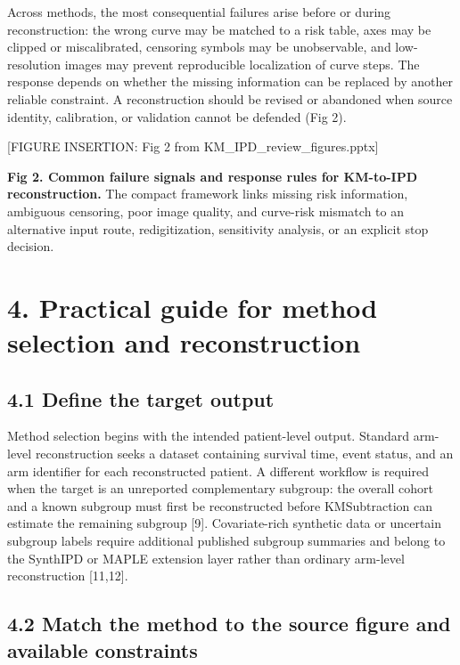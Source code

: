 \documentclass[
  english,
  letterpaper,
  DIV=11,
  numbers=noendperiod]{scrartcl}
\begin{document}
Across methods, the most consequential failures arise before or during
reconstruction: the wrong curve may be matched to a risk table, axes may
be clipped or miscalibrated, censoring symbols may be unobservable, and
low-resolution images may prevent reproducible localization of curve
steps. The response depends on whether the missing information can be
replaced by another reliable constraint. A reconstruction should be
revised or abandoned when source identity, calibration, or validation
cannot be defended (Fig 2).

{[}FIGURE INSERTION: Fig 2 from KM\_IPD\_review\_figures.pptx{]}

\textbf{Fig 2. Common failure signals and response rules for KM-to-IPD
reconstruction.} The compact framework links missing risk information,
ambiguous censoring, poor image quality, and curve-risk mismatch to an
alternative input route, redigitization, sensitivity analysis, or an
explicit stop decision.

\section{4. Practical guide for method selection and
reconstruction}\label{practical-guide-for-method-selection-and-reconstruction}

\subsection{4.1 Define the target
output}\label{define-the-target-output}

Method selection begins with the intended patient-level output. Standard
arm-level reconstruction seeks a dataset containing survival time, event
status, and an arm identifier for each reconstructed patient. A
different workflow is required when the target is an unreported
complementary subgroup: the overall cohort and a known subgroup must
first be reconstructed before KMSubtraction can estimate the remaining
subgroup {[}9{]}. Covariate-rich synthetic data or uncertain subgroup
labels require additional published subgroup summaries and belong to the
SynthIPD or MAPLE extension layer rather than ordinary arm-level
reconstruction {[}11,12{]}.

\subsection{4.2 Match the method to the source figure and available
constraints}\label{match-the-method-to-the-source-figure-and-available-constraints}
\end{document}
